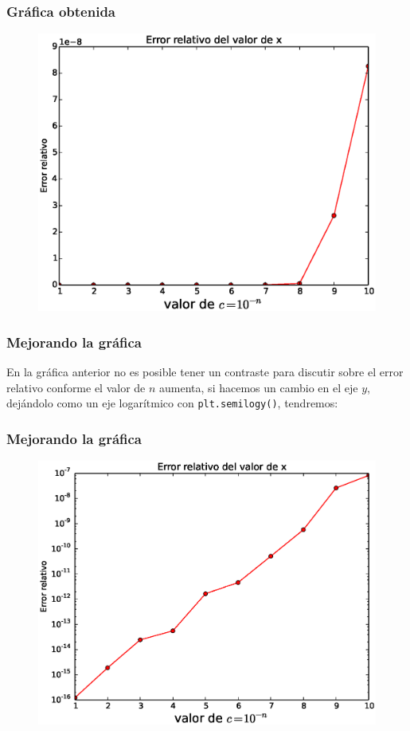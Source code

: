 \begin{frame}
\frametitle{Gráfica obtenida}
\begin{figure}
    \centering
    \includegraphics[scale=0.5]{Imagenes/Ejercicio_Eq_Cuadratica_01.eps}
\end{figure}
\end{frame}
\begin{frame}
\frametitle{Mejorando la gráfica}
En la gráfica anterior no es posible tener un contraste para discutir sobre el error relativo conforme el valor de $n$ aumenta, si hacemos un cambio en el eje $y$, dejándolo como un eje logarítmico con \texttt{plt.semilogy()}, tendremos:
\end{frame}
\begin{frame}
\frametitle{Mejorando la gráfica}
\begin{figure}
    \centering
    \includegraphics[scale=0.5]{Imagenes/Ejercicio_Eq_Cuadratica_02.eps}
\end{figure}
\end{frame}   
